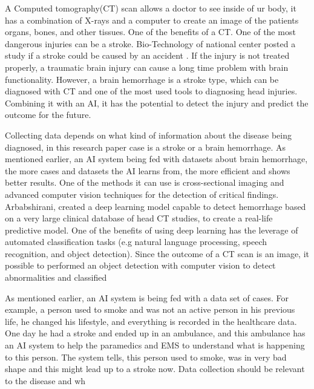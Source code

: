 \documentclass[fleqn,10pt]{wlscirep}
\begin{document}
A Computed tomography(CT) scan allows a doctor to see inside of ur body, it has a combination of X-rays and a computer to create an image of the patients organs, bones, and other tissues. One of the benefits of a CT. One of the most dangerous injuries can be a stroke. Bio-Technology of national center posted a study if a stroke could be caused by an accident \cite{Kilde16}. If the injury is not treated properly, a traumatic brain injury can cause a long time problem with brain functionality. However, a brain hemorrhage is a stroke type, which can be diagnosed with CT and one of the most used tools to diagnosing head injuries. Combining it with an AI, it has the potential to detect the injury and predict the outcome for the future.

Collecting data depends on what kind of information about the disease being diagnosed, in this research paper case is a stroke or a brain hemorrhage. As mentioned earlier, an AI system being fed with datasets about brain hemorrhage, the more cases and datasets the AI learns from, the more efficient and shows better results. One of the methods it can use is cross-sectional imaging and advanced computer vision techniques for the detection of critical findings. Arbabshirani\cite{Kilde15}, created a deep learning model capable to detect hemorrhage based on a very large clinical database of head CT studies, to create a real-life predictive model. One of the benefits of using deep learning has the leverage of automated classification tasks (e.g natural language processing, speech recognition, and object detection). Since the outcome of a CT scan is an image, it possible to performed an object detection with computer vision to detect abnormalities and classified


As mentioned earlier, an AI system is being fed with a data set of cases. 
For example, a person used to smoke and was not an active person in his previous life, he changed his lifestyle, and everything is recorded in the healthcare data. One day he had a stroke and ended up in an ambulance, and this ambulance has an AI system to help the paramedics and EMS to understand what is happening to this person. The system tells, this person used to smoke, was in very bad shape and this might lead up to a stroke now. Data collection should be relevant to the disease and wh
\end{document}
